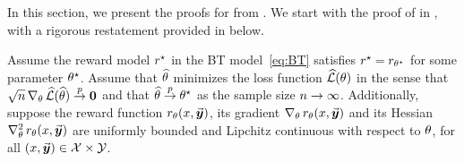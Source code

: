         In this section, we present the proofs for  from . 
        We start with the proof of  in , with a rigorous restatement provided in  below.
    		\begin{theorem}
			\label{thm:asymp_full_full}
			Assume the reward model $r^{\star}$ in the BT model~\eqref{eq:BT} satisfies $r^{\star} = r_{\theta^{\star}}$ for some parameter $\theta^{\star}$.
			Assume that $\widehat{\theta}$ minimizes the loss function $\widehat{\mathcal{L}}(\theta)$ in the sense that $\sqrt{n} \, \nabla_{\theta} \,  \widehat{\mathcal{L}} (\widehat{\theta}) \stackrel{p}{\rightarrow} \boldsymbol{0}$ and that $\widehat{\theta} \stackrel{p}{\rightarrow} \theta^{\star}$ as the sample size $n \rightarrow \infty$.
			Additionally, suppose the reward function $r_{\theta}(x, \vec{\boldsymbol{y}}\!\,)$, its gradient $\nabla_{\theta} \,  r_{\theta}(x, \vec{\boldsymbol{y}}\!\,)$ and its Hessian $\nabla_{\theta}^2 \,  r_{\theta}(x, \vec{\boldsymbol{y}}\!\,)$ are uniformly bounded and Lipchitz continuous with respect to $\theta$, for all $(x, \vec{\boldsymbol{y}}\!\,) \in \mathcal{X} \times \mathcal{Y}$.
			

\end{theorem}

